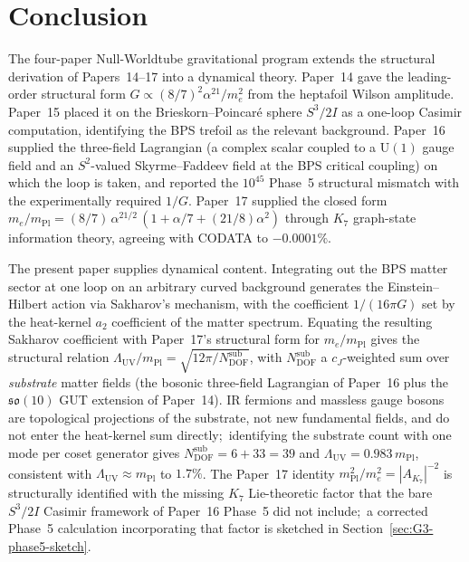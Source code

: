 \documentclass[11pt]{article}
\newcommand{\so}{\mathfrak{so}}
\newcommand{\mPl}{m_{\mathrm{Pl}}}
\newcommand{\me}{m_e}
\newcommand{\U}{\mathrm{U}}
\begin{document}
\section{Conclusion}
\label{sec:conclusion}

The four-paper Null-Worldtube gravitational program extends the
structural derivation of Papers~14--17 into a dynamical theory.
Paper~14 gave the leading-order structural form
$G \propto (8/7)^2 \alpha^{21} / \me^2$ from the heptafoil Wilson
amplitude.  Paper~15 placed it on the Brieskorn--Poincar\'e sphere
$S^3/2I$ as a one-loop Casimir computation, identifying the BPS
trefoil as the relevant background.  Paper~16 supplied the
three-field Lagrangian (a complex scalar coupled to a $\U(1)$
gauge field and an $S^2$-valued Skyrme--Faddeev field at the BPS
critical coupling) on which the loop is taken, and reported the
$10^{45}$ Phase~5 structural mismatch with the experimentally
required $1/G$.  Paper~17 supplied the closed form
$\me/\mPl = (8/7)\,\alpha^{21/2}\,(1 + \alpha/7 + (21/8)\alpha^2)$
through $K_7$ graph-state information theory, agreeing with CODATA
to $-0.0001\%$.

The present paper supplies dynamical content.  Integrating out the
BPS matter sector at one loop on an arbitrary curved background
generates the Einstein--Hilbert action via Sakharov's mechanism,
with the coefficient $1/(16\pi G)$ set by the heat-kernel $a_2$
coefficient of the matter spectrum.  Equating the resulting
Sakharov coefficient with Paper~17's structural form for $\me/\mPl$
gives the structural relation
$\Lambda_{\mathrm{UV}}/\mPl =
\sqrt{12\pi/N_{\mathrm{DOF}}^{\mathrm{sub}}}$, with
$N_{\mathrm{DOF}}^{\mathrm{sub}}$ a $c_J$-weighted sum over
\emph{substrate} matter fields (the bosonic three-field Lagrangian
of Paper~16 plus the $\so(10)$ GUT extension of Paper~14).  IR
fermions and massless gauge bosons are topological projections of
the substrate, not new fundamental fields, and do not enter the
heat-kernel sum directly;\ identifying the substrate count with one
mode per coset generator gives
$N_{\mathrm{DOF}}^{\mathrm{sub}} = 6 + 33 = 39$ and
$\Lambda_{\mathrm{UV}} = 0.983\,\mPl$, consistent with
$\Lambda_{\mathrm{UV}} \approx \mPl$ to $1.7\%$.  The Paper~17
identity $\mPl^2/\me^2 = |A_{K_7}|^{-2}$ is structurally identified
with the missing $K_7$ Lie-theoretic factor that the bare
$S^3/2I$ Casimir framework of Paper~16 Phase~5 did not include;\
a corrected Phase~5 calculation incorporating that factor is
sketched in Section~\ref{sec:G3-phase5-sketch}.
\end{document}
